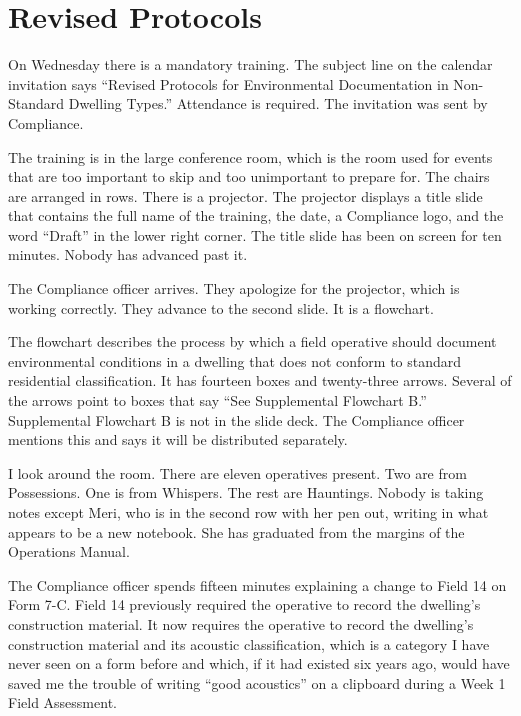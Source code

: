 
\chapter{Revised Protocols}

On Wednesday there is a mandatory training. The subject line on the calendar invitation says ``Revised Protocols for Environmental Documentation in Non-Standard Dwelling Types.'' Attendance is required. The invitation was sent by Compliance.

The training is in the large conference room, which is the room used for events that are too important to skip and too unimportant to prepare for. The chairs are arranged in rows. There is a projector. The projector displays a title slide that contains the full name of the training, the date, a Compliance logo, and the word ``Draft'' in the lower right corner. The title slide has been on screen for ten minutes. Nobody has advanced past it.

The Compliance officer arrives. They apologize for the projector, which is working correctly. They advance to the second slide. It is a flowchart.

The flowchart describes the process by which a field operative should document environmental conditions in a dwelling that does not conform to standard residential classification. It has fourteen boxes and twenty-three arrows. Several of the arrows point to boxes that say ``See Supplemental Flowchart B.'' Supplemental Flowchart B is not in the slide deck. The Compliance officer mentions this and says it will be distributed separately.

I look around the room. There are eleven operatives present. Two are from Possessions. One is from Whispers. The rest are Hauntings. Nobody is taking notes except Meri, who is in the second row with her pen out, writing in what appears to be a new notebook. She has graduated from the margins of the Operations Manual.

The Compliance officer spends fifteen minutes explaining a change to Field 14 on Form 7-C. Field 14 previously required the operative to record the dwelling's construction material. It now requires the operative to record the dwelling's construction material and its acoustic classification, which is a category I have never seen on a form before and which, if it had existed six years ago, would have saved me the trouble of writing ``good acoustics'' on a clipboard during a Week 1 Field Assessment.

